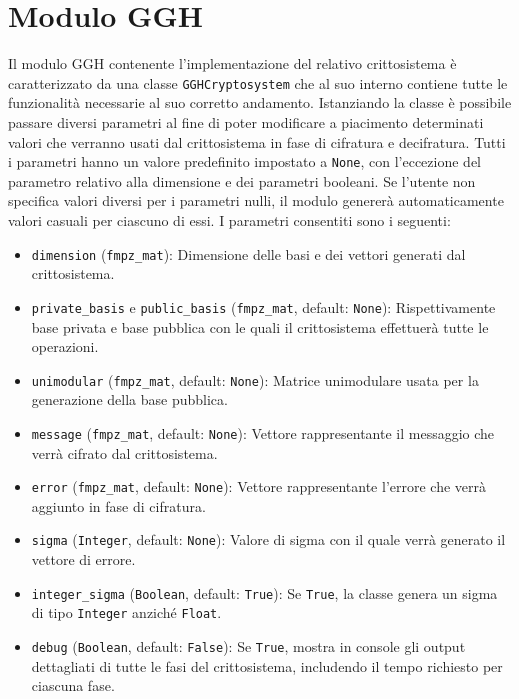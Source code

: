 \section{Modulo GGH}
\label{sec:moduloggh}

Il modulo GGH contenente l'implementazione del relativo crittosistema è caratterizzato
da una classe \texttt{GGHCryptosystem} che al suo interno contiene tutte le funzionalità
necessarie al suo corretto andamento. Istanziando la classe è possibile passare 
diversi parametri al fine di poter modificare a piacimento determinati valori 
che verranno usati dal crittosistema in fase di cifratura e decifratura.
Tutti i parametri hanno un valore predefinito impostato a \texttt{None}, con l'eccezione del 
parametro relativo alla dimensione e dei parametri booleani. 
Se l'utente non specifica valori diversi per i parametri nulli, il modulo genererà automaticamente valori casuali per ciascuno 
di essi. I parametri consentiti sono i seguenti:
\begin{itemize}
    \item \texttt{dimension} (\texttt{fmpz\_mat}): 
    Dimensione delle basi e dei vettori generati dal crittosistema.
    \item \texttt{private\_basis} e \texttt{public\_basis} (\texttt{fmpz\_mat}, default: \texttt{None}): 
    Rispettivamente base privata e base pubblica con le quali il crittosistema effettuerà 
    tutte le operazioni.
    \item \texttt{unimodular} (\texttt{fmpz\_mat}, default: \texttt{None}):
    Matrice unimodulare usata per la generazione della base pubblica. 
    \item \texttt{message} (\texttt{fmpz\_mat}, default: \texttt{None}): 
    Vettore rappresentante il messaggio che verrà cifrato dal crittosistema.
    \item \texttt{error} (\texttt{fmpz\_mat}, default: \texttt{None}): 
    Vettore rappresentante l'errore che verrà aggiunto in fase di cifratura.
    \item \texttt{sigma} (\texttt{Integer}, default: \texttt{None}): 
    Valore di sigma con il quale verrà generato il vettore di errore. 
    \item \texttt{integer\_sigma} (\texttt{Boolean}, default: \texttt{True}):
    Se \texttt{True}, la classe genera un sigma di tipo \texttt{Integer} anziché \texttt{Float}.
    \item \texttt{debug} (\texttt{Boolean}, default: \texttt{False}):
    Se \texttt{True}, mostra in console gli output dettagliati di tutte le fasi del 
    crittosistema, includendo il tempo richiesto per ciascuna fase. 
\end{itemize}


